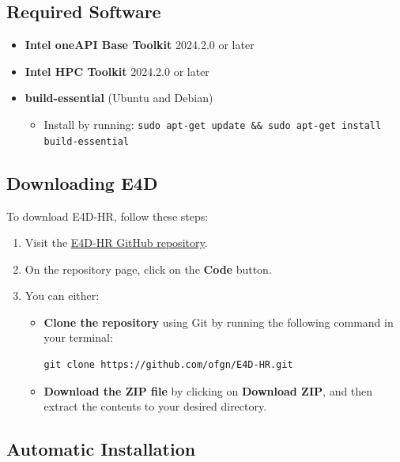 \documentclass[a4paper,12pt]{article}
\begin{document}
\subsection{Required Software}

\begin{itemize}
    \item \textbf{Intel oneAPI Base Toolkit} 2024.2.0 or later
    \item \textbf{Intel HPC Toolkit} 2024.2.0 or later
    \item \textbf{build-essential} (Ubuntu and Debian)
          \begin{itemize}
              \item Install by running: \texttt{sudo apt-get update \&\& sudo apt-get install
                        build-essential}
          \end{itemize}
\end{itemize}

\subsection{Downloading E4D}

To download E4D-HR, follow these steps:

\begin{enumerate}
    \item Visit the \href{https://github.com/ofgn/E4D-HR}{E4D-HR GitHub repository}.
    \item On the repository page, click on the \textbf{Code} button.
    \item You can either:
          \begin{itemize}
              \item \textbf{Clone the repository} using Git by running the following command in your terminal:
                    \begin{verbatim}
git clone https://github.com/ofgn/E4D-HR.git
        \end{verbatim}
              \item \textbf{Download the ZIP file} by clicking on \textbf{Download ZIP}, and then extract the contents to your desired directory.
          \end{itemize}
\end{enumerate}

\subsection{Automatic Installation}
\end{document}

